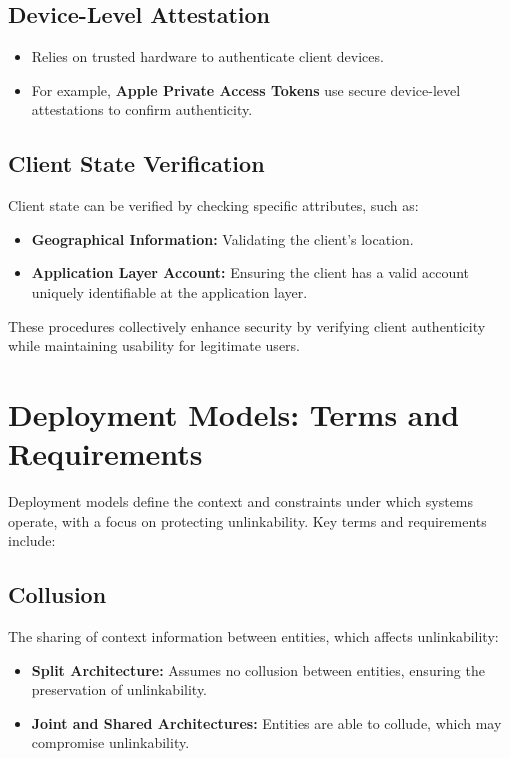\subsection{Device-Level Attestation}
\begin{itemize}
    \item Relies on trusted hardware to authenticate client devices.
    \item For example, \textbf{Apple Private Access Tokens} use secure device-level attestations to confirm authenticity.
\end{itemize}

\subsection{Client State Verification}
Client state can be verified by checking specific attributes, such as:
\begin{itemize}
    \item \textbf{Geographical Information:} Validating the client's location.
    \item \textbf{Application Layer Account:} Ensuring the client has a valid account uniquely identifiable at the application layer.
\end{itemize}

These procedures collectively enhance security by verifying client authenticity while maintaining usability for legitimate users.

\section{Deployment Models: Terms and Requirements}

Deployment models define the context and constraints under which systems operate, with a focus on protecting unlinkability. Key terms and requirements include:

\subsection{Collusion}
The sharing of context information between entities, which affects unlinkability:
\begin{itemize}
    \item \textbf{Split Architecture:} Assumes no collusion between entities, ensuring the preservation of unlinkability.
    \item \textbf{Joint and Shared Architectures:} Entities are able to collude, which may compromise unlinkability.
\end{itemize}


